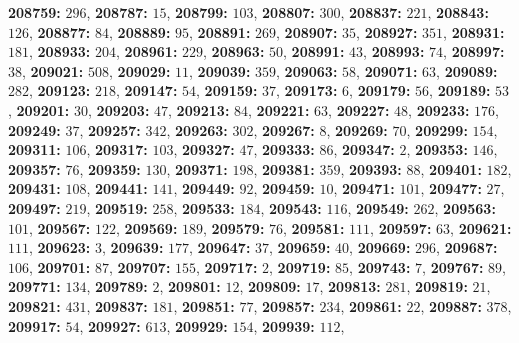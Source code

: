 \textsf{\bfseries 208759:} $296$, \textsf{\bfseries 208787:} $15$, \textsf{\bfseries 208799:} $103$, \textsf{\bfseries 208807:} $300$, \textsf{\bfseries 208837:} $221$, \textsf{\bfseries 208843:} $126$, \textsf{\bfseries 208877:} $84$, \textsf{\bfseries 208889:} $95$, \textsf{\bfseries 208891:} $269$, \textsf{\bfseries 208907:} $35$, \textsf{\bfseries 208927:} $351$, \textsf{\bfseries 208931:} $181$, \textsf{\bfseries 208933:} $204$, \textsf{\bfseries 208961:} $229$, \textsf{\bfseries 208963:} $50$, \textsf{\bfseries 208991:} $43$, \textsf{\bfseries 208993:} $74$, \textsf{\bfseries 208997:} $38$, \textsf{\bfseries 209021:} $508$, \textsf{\bfseries 209029:} $11$, \textsf{\bfseries 209039:} $359$, \textsf{\bfseries 209063:} $58$, \textsf{\bfseries 209071:} $63$, \textsf{\bfseries 209089:} $282$, \textsf{\bfseries 209123:} $218$, \textsf{\bfseries 209147:} $54$, \textsf{\bfseries 209159:} $37$, \textsf{\bfseries 209173:} $6$, \textsf{\bfseries 209179:} $56$, \textsf{\bfseries 209189:} $53$, \textsf{\bfseries 209201:} $30$, \textsf{\bfseries 209203:} $47$, \textsf{\bfseries 209213:} $84$, \textsf{\bfseries 209221:} $63$, \textsf{\bfseries 209227:} $48$, \textsf{\bfseries 209233:} $176$, \textsf{\bfseries 209249:} $37$, \textsf{\bfseries 209257:} $342$, \textsf{\bfseries 209263:} $302$, \textsf{\bfseries 209267:} $8$, \textsf{\bfseries 209269:} $70$, \textsf{\bfseries 209299:} $154$, \textsf{\bfseries 209311:} $106$, \textsf{\bfseries 209317:} $103$, \textsf{\bfseries 209327:} $47$, \textsf{\bfseries 209333:} $86$, \textsf{\bfseries 209347:} $2$, \textsf{\bfseries 209353:} $146$, \textsf{\bfseries 209357:} $76$, \textsf{\bfseries 209359:} $130$, \textsf{\bfseries 209371:} $198$, \textsf{\bfseries 209381:} $359$, \textsf{\bfseries 209393:} $88$, \textsf{\bfseries 209401:} $182$, \textsf{\bfseries 209431:} $108$, \textsf{\bfseries 209441:} $141$, \textsf{\bfseries 209449:} $92$, \textsf{\bfseries 209459:} $10$, \textsf{\bfseries 209471:} $101$, \textsf{\bfseries 209477:} $27$, \textsf{\bfseries 209497:} $219$, \textsf{\bfseries 209519:} $258$, \textsf{\bfseries 209533:} $184$, \textsf{\bfseries 209543:} $116$, \textsf{\bfseries 209549:} $262$, \textsf{\bfseries 209563:} $101$, \textsf{\bfseries 209567:} $122$, \textsf{\bfseries 209569:} $189$, \textsf{\bfseries 209579:} $76$, \textsf{\bfseries 209581:} $111$, \textsf{\bfseries 209597:} $63$, \textsf{\bfseries 209621:} $111$, \textsf{\bfseries 209623:} $3$, \textsf{\bfseries 209639:} $177$, \textsf{\bfseries 209647:} $37$, \textsf{\bfseries 209659:} $40$, \textsf{\bfseries 209669:} $296$, \textsf{\bfseries 209687:} $106$, \textsf{\bfseries 209701:} $87$, \textsf{\bfseries 209707:} $155$, \textsf{\bfseries 209717:} $2$, \textsf{\bfseries 209719:} $85$, \textsf{\bfseries 209743:} $7$, \textsf{\bfseries 209767:} $89$, \textsf{\bfseries 209771:} $134$, \textsf{\bfseries 209789:} $2$, \textsf{\bfseries 209801:} $12$, \textsf{\bfseries 209809:} $17$, \textsf{\bfseries 209813:} $281$, \textsf{\bfseries 209819:} $21$, \textsf{\bfseries 209821:} $431$, \textsf{\bfseries 209837:} $181$, \textsf{\bfseries 209851:} $77$, \textsf{\bfseries 209857:} $234$, \textsf{\bfseries 209861:} $22$, \textsf{\bfseries 209887:} $378$, \textsf{\bfseries 209917:} $54$, \textsf{\bfseries 209927:} $613$, \textsf{\bfseries 209929:} $154$, \textsf{\bfseries 209939:} $112$, 
